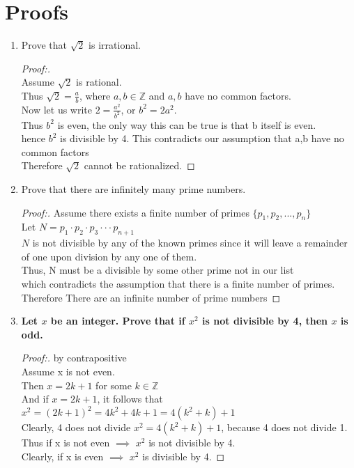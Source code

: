 \documentclass[11pt]{article}
\begin{document}
\section{Proofs}
\begin{enumerate}
    \item Prove that $\sqrt{2}$ is irrational.
        \begin{proof}[Proof:\nopunct] \\ 
             Assume $\sqrt{2}$ is rational. 
             \\ Thus $\sqrt{2} = \frac{a}{b}$, where $a,b \in \mathbb{Z}$ and $a,b$ have no common factors.
             \\ Now let us write $2 = \frac{a^2}{b^2}$, or $b^2=2a^2$.
             \\ Thus $b^2$ is even, the only way this can be true is that b itself is even.
             \\ hence $b^2$ is divisible by 4. This contradicts our assumption that a,b have no common factors
             \\ Therefore $\sqrt{2}$ cannot be rationalized.
        \end{proof}
        
    \item Prove that there are infinitely many prime numbers.
        \begin{proof}[Proof:\nopunct]
            Assume there exists a finite number of primes $\{p_1, p_2, ... , p_n \}$ 
            \\ Let $N = p_1\cdot p_2 \cdot p_3 \cdot \cdot \cdot p_{n+1}$
            \\ $N$ is not divisible by any of the known primes since it will leave a remainder of one upon division by any one of them.
            \\ Thus, N must be a divisible by some other prime not in our list
            \\ which contradicts the assumption that there is a finite number of primes.
            \\ Therefore There are an infinite number of prime numbers
        \end{proof}
        
    \item \textbf{ Let $x$ be an integer. Prove that if $x^2$ is not divisible by 4, then $x$ is odd.}
        \begin{proof}[Proof:\nopunct] by contrapositive
            \\ Assume x is not even.
            \\ Then $x = 2k + 1$ for some $k\in \mathbb{Z}$
            \\ And if $x = 2k + 1$, it follows that 
            \\ $x^2 = (2k+1)^2= 4k^2 + 4k + 1 = 4(k^2+k)+1$
            \\ Clearly, 4 does not divide $x^2=4(k^2+k)+1$, because 4 does not divide 1.
            \\ Thus if x is not even $\implies$ $x^2$ is not divisible by 4.
            \\ Clearly, if x is even $\implies$ $x^2$ is divisible by 4.
        \end{proof}
        

\end{enumerate}
\end{document}
